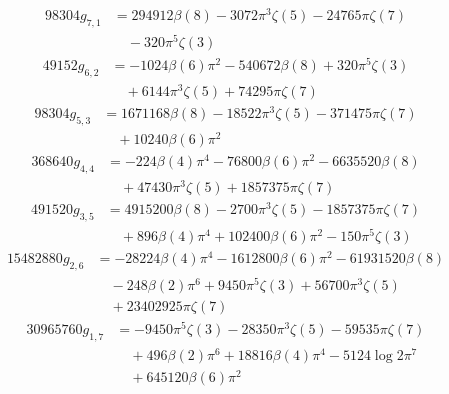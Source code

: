 \begin{equation}\begin{split}98304 g_{7,1} &= 294912 \beta(8) - 3072 \pi^{3} \zeta(5) - 24765 \pi \zeta(7)\\ &\quad {}- 320 \pi^{5} \zeta(3)\end{split}\end{equation}
\begin{equation}\begin{split}49152 g_{6,2} &= - 1024 \beta(6) \pi^{2} - 540672 \beta(8) + 320 \pi^{5} \zeta(3)\\ &\quad {}+6144 \pi^{3} \zeta(5) + 74295 \pi \zeta(7)\end{split}\end{equation}
\begin{equation}\begin{split}98304 g_{5,3} &= 1671168 \beta(8) - 18522 \pi^{3} \zeta(5) - 371475 \pi \zeta(7)\\ &\quad {}+10240 \beta(6) \pi^{2}\end{split}\end{equation}
\begin{equation}\begin{split}368640 g_{4,4} &= - 224 \beta(4) \pi^{4} - 76800 \beta(6) \pi^{2} - 6635520 \beta(8)\\ &\quad {}+47430 \pi^{3} \zeta(5) + 1857375 \pi \zeta(7)\end{split}\end{equation}
\begin{equation}\begin{split}491520 g_{3,5} &= 4915200 \beta(8) - 2700 \pi^{3} \zeta(5) - 1857375 \pi \zeta(7)\\ &\quad {}+896 \beta(4) \pi^{4} + 102400 \beta(6) \pi^{2} - 150 \pi^{5} \zeta(3)\end{split}\end{equation}
\begin{equation}\begin{split}15482880 g_{2,6} &= - 28224 \beta(4) \pi^{4} - 1612800 \beta(6) \pi^{2} - 61931520 \beta(8)\\ &\quad {}- 248 \beta(2) \pi^{6} + 9450 \pi^{5} \zeta(3) + 56700 \pi^{3} \zeta(5)\\ &\quad {}+23402925 \pi \zeta(7)\end{split}\end{equation}
\begin{equation}\begin{split}30965760 g_{1,7} &= - 9450 \pi^{5} \zeta(3) - 28350 \pi^{3} \zeta(5) - 59535 \pi \zeta(7)\\ &\quad {}+496 \beta(2) \pi^{6} + 18816 \beta(4) \pi^{4} - 5124 \log 2 \pi^{7}\\ &\quad {}+645120 \beta(6) \pi^{2}\end{split}\end{equation}
